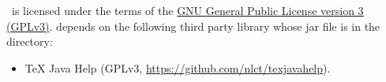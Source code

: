 \chapter{}
\label{sec:licence}

%
\JDRView\ is licensed under the terms of the 
\href{https://www.gnu.org/licenses/gpl-3.0.html}{GNU General
Public License version 3 (GPLv3)}.
 depends on the following third party library whose jar
file is in the  directory:
\begin{itemize}
   \item TeX Java Help 
   (GPLv3, \url{https://github.com/nlct/texjavahelp}).
\end{itemize}



\printmain
\printindex 

 

